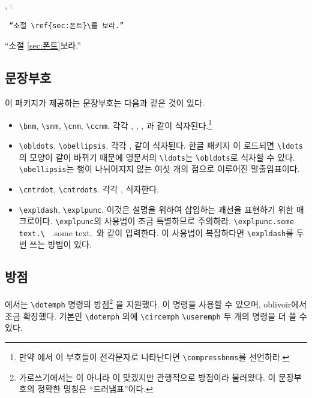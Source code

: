 \documentclass[
	12pt,
	a4paper,
	kosection,
	footnote,
	microtype,
	figtabcapt,
]{oblivoir}
\def\myREF#1#2{\ref{#1}}
\def\myREF#1#2{\ref{#2}}
\def\cs#1{\texttt{\textbackslash #1}}
\def\xetexko{\XeTeX-\ko}
\def\luatexko{\LuaTeX-\ko}
\begin{document}
\noindent{}, :\\
\noindent\begin{minipage}{.45\textwidth}
\begin{verbatim}
 “소절 \ref{sec:폰트}\를 보라.”
\end{verbatim}
\end{minipage}\hfill
\begin{minipage}{.45\textwidth}
\hfill “소절 \myREF{sec:font}{sec:폰트}\를 보라.”
\end{minipage}

\subsection{문장부호}

이 패키지가 제공하는 문장부호는 다음과 같은 것이 있다.

\begin{itemize}
\item \verb|\bnm|, \verb|\snm|, \verb|\cnm|, \verb|\ccnm|. 각각 , , , 과 같이 식자된다.\footnote{만약 \LuaTeX 에서 이 부호들이
전각문자로 나타난다면 \cs{compressbnms}를 선언하라.}
\item \verb|\obldots|. \verb|\obellipsis|. 각각 \obldots,  같이 식자된다. 한글 패키지 \koTeX 이 로드되면 \verb|\ldots|의 모양이  같이 바뀌기 때문에 영문서의 \verb|\ldots|는 \verb|\obldots|로 식자할 \obldots 수 있다. \verb|\obellipsis|는 행이 나뉘어지지 않는 여섯 개의 점으로 이루어진 말출임표이다.
\item \verb|\cntrdot|, \verb|\cntrdots|. 각각 \cntrdot,  식자한다.
\item \verb|\expldash|, \verb|\explpunc|. 이것은 설명을 위하여 삽입하는 괘선\expldash 을 표현하기 위한 매크로이다. \verb|\explpunc|의 사용법이 조금 특별하므로 주의하라. \verb*|\explpunc.some text.\ | \explpunc.some text.\ 와 같이 입력한다. 이 사용법이 복잡하다면 \verb|\expldash|를 두 번 쓰는 방법이 있다.
\end{itemize}


\subsection{방점}

\koTeX 에서는 \texttt{\textbackslash dotemph} 명령의 방점\footnote{%
	가로쓰기에서는  이 아니라
	이 맞겠지만 관행적으로 방점이라 불러왔다.
	이 문장부호의 정확한 명칭은 “드러냄표”이다.}%
을 지원했다.   이 명령을 사용할 수 있으며,
oblivoir에서 조금 확장했다. 기본인
\texttt{\textbackslash dotemph}
외에
\texttt{\textbackslash circemph}
\texttt{\textbackslash useremph}
두 개의 명령을 더 쓸 수 있다.
\end{document}
